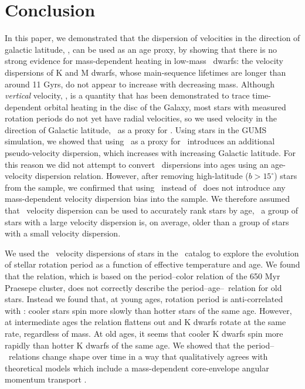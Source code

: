 \section{Conclusion}

In this paper, we demonstrated that the dispersion of velocities in the
direction of galactic latitude, \vb, can be used as an age proxy, by showing
that there is no strong evidence for mass-dependent heating in low-mass
\kepler\ dwarfs: the velocity dispersions of K and M dwarfs, whose
main-sequence lifetimes are longer than around 11 Gyrs, do not appear to
increase with decreasing mass.
Although {\it vertical} velocity, \vz, is a quantity that has been
demonstrated to trace time-dependent orbital heating in the disc of the
Galaxy, most stars with measured rotation periods do not yet have radial
velocities, so we used velocity in the direction of Galactic latitude, \vb\,
as a proxy for \vz.
Using stars in the GUMS simulation, we showed that using \vb\ as a proxy for
\vz\ introduces an additional pseudo-velocity dispersion, which increases with
increasing Galactic latitude.
For this reason we did not attempt to convert \vb\ dispersions into ages using
an age-velocity dispersion relation.
However, after removing high-latitude ($b>15^\circ$) stars from the sample, we
confirmed that using \vb\ instead of \vz\ does not introduce any
mass-dependent velocity dispersion bias into the sample.
We therefore assumed that \vb\ velocity dispersion can be used to accurately
rank stars by age, \ie\ a group of stars with a large velocity dispersion is,
on average, older than a group of stars with a small velocity dispersion.

We used the \vb\ velocity dispersions of stars in the \mct\ catalog to explore
the evolution of stellar rotation period as a function of effective
temperature and age.
We found that the \citet{angus2019} relation, which is based on the
period--color relation of the 650 Myr Praesepe cluster, does not correctly
describe the period--age--\teff\ relation for old stars.
Instead we found that, at young ages, rotation period is anti-correlated with
\teff: cooler stars spin more slowly than hotter stars of the same age.
However, at intermediate ages the relation flattens out and K dwarfs rotate at
the same rate, regardless of mass.
At old ages, it seems that cooler K dwarfs spin more rapidly than hotter K
dwarfs of the same age.
We showed that the period--\teff\ relations change shape over time in a way
that qualitatively agrees with theoretical models which include a
mass-dependent core-envelope angular momentum transport \citep{spada2019}.

